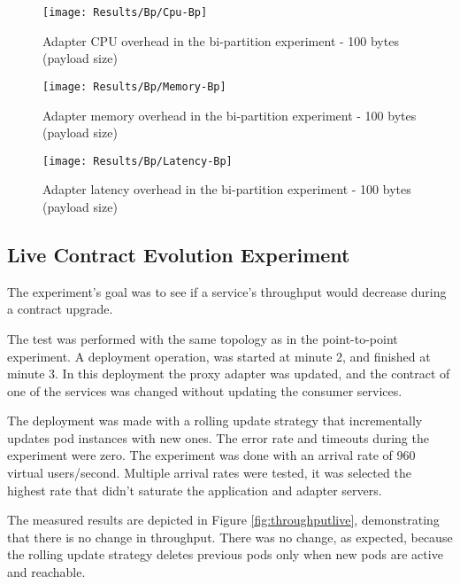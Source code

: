 \begin{figure}[htbp]
    \centering
    \centerline{\texttt{[image: Results/Bp/Cpu-Bp]}}
    \caption{Adapter CPU overhead in the bi-partition experiment - 100 bytes (payload size)}
    \label{fig:biPartCPU}
\end{figure}

\begin{figure}[htbp]
    \centering
    \centerline{\texttt{[image: Results/Bp/Memory-Bp]}}
    \caption{Adapter memory overhead in the bi-partition experiment - 100 bytes (payload size)}
    \label{fig:biPartMem}
\end{figure}

\begin{figure}[htbp]
    \centering
    \centerline{\texttt{[image: Results/Bp/Latency-Bp]}}
    \caption{Adapter latency overhead in the bi-partition experiment - 100 bytes (payload size)}
    \label{fig:biPartLatency}
\end{figure}

\subsection{Live Contract Evolution Experiment}

The experiment's goal was to see if a service's throughput would decrease during a contract upgrade.

The test was performed with the same topology as in the point-to-point experiment.
A deployment operation, was started at minute 2, and finished at minute 3.
In this deployment the proxy adapter was updated, and the contract of one of the services was changed without updating the consumer services.

The deployment was made with a rolling update strategy that incrementally updates pod instances with new ones.
The error rate and timeouts during the experiment were zero.
The experiment was done with an arrival rate of 960 virtual users/second.
Multiple arrival rates were tested, it was selected the highest rate that didn't saturate the application and adapter servers.

The measured results are depicted in Figure \ref{fig:throughputlive}, demonstrating that there is no change in throughput.
There was no change, as expected, because the rolling update strategy deletes previous pods only when new pods are active and reachable.